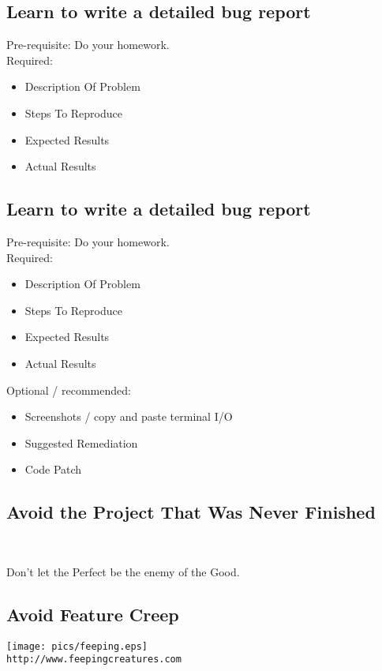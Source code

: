 \documentclass[xga]{xdvislides}
\begin{document}
\subsection{Learn to write a detailed bug report}
Pre-requisite: Do your homework. \\

Required:
\begin{itemize}
	\item Description Of Problem
	\item Steps To Reproduce
	\item Expected Results
	\item Actual Results
\end{itemize}

\subsection{Learn to write a detailed bug report}
Pre-requisite: Do your homework. \\

Required:
\begin{itemize}
	\item Description Of Problem
	\item Steps To Reproduce
	\item Expected Results
	\item Actual Results
\end{itemize}
\vspace{.125in}

Optional / recommended:
\begin{itemize}
	\item Screenshots / copy and paste terminal I/O
	\item Suggested Remediation
	\item Code Patch
\end{itemize}

\subsection{Avoid the Project That Was Never Finished}
\\
\Huge
\begin{center}
	Don't let the Perfect be the enemy of the Good.
\end{center}
\Normalsize

\subsection{Avoid Feature Creep}
\vspace*{\fill}
\begin{center}
	\texttt{[image: pics/feeping.eps]} \\
	\small
	\verb+http://www.feepingcreatures.com+
\end{center}
\vspace*{\fill}
\end{document}
